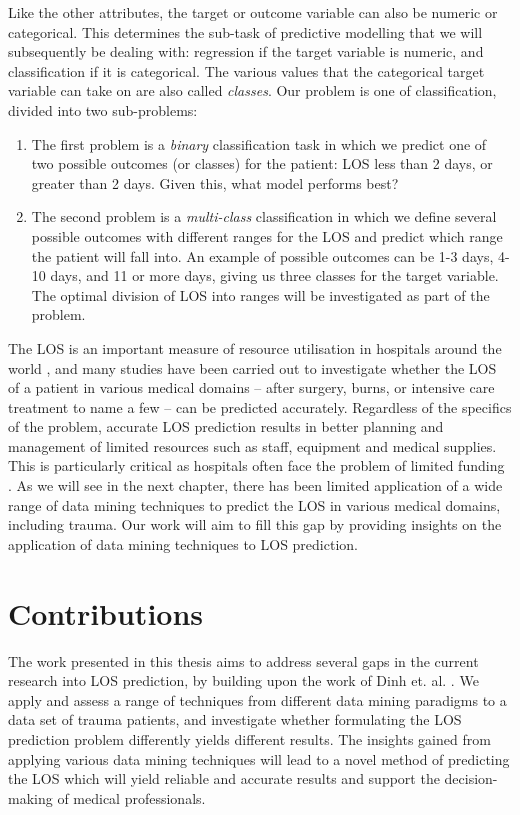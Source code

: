 Like the other attributes, the target or outcome variable can also be numeric
or categorical. This determines the sub-task of predictive modelling that we
will subsequently be dealing with: regression if the target variable is
numeric, and classification if it is categorical. The various values that the
categorical target variable can take on are also called \textit{classes}.
Our problem is one of classification, divided into two sub-problems:

\begin{enumerate}
\item The first problem is a \textit{binary} classification task in which we
predict one of two possible outcomes (or classes) for the patient: LOS less
than 2 days, or greater than 2 days. Given this, what model performs best?
\item The second problem is a \textit{multi-class} classification in which we
define several possible outcomes with different ranges for the LOS and predict
which range the patient will fall into. An example of possible outcomes can be
1-3 days, 4-10 days, and 11 or more days, giving us three classes for the
target variable. The optimal division of LOS into ranges will be investigated
as part of the problem.
\end{enumerate}

The LOS is an important measure of resource utilisation in hospitals around
the world \citep{Ng2006},
and many studies have been carried out to investigate whether the
LOS of a patient in various medical domains -- after surgery, burns, or
intensive care treatment to name a few -- can be predicted accurately.
Regardless of the
specifics of the problem, accurate LOS prediction results in better planning
and management of limited resources such as staff, equipment and medical
supplies. This is particularly critical as hospitals often face the problem
of limited funding \citep{Walczak2003}.
As we will see in the next chapter, there has been limited
application of a wide range of data mining techniques to predict the LOS in
various medical domains, including trauma. Our work will aim to fill this
gap by providing insights on the application of data mining techniques to
LOS prediction.

\section{Contributions}
The work presented in this thesis aims to address several gaps in the current
research into LOS prediction, by building upon the work of Dinh et. al.
\citep{Dinh2013a}.
We apply and assess a range of techniques from different data mining paradigms
to a data set of trauma patients, and investigate whether formulating the LOS
prediction problem differently yields different results. The insights gained
from applying various data mining techniques will lead to a novel method of
predicting the LOS which will yield reliable and accurate results and support
the decision-making of medical professionals.

